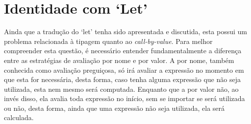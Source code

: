 \section{Identidade com `Let'}
Ainda que a tradução do `let' tenha sido apresentada e discutida, esta possui um problema relacionada à tipagem quanto ao \textit{call-by-value}.
Para melhor compreender esta questão, é necessário entender fundamentalmente a diferença entre as estratégias de avaliação por nome e por valor.
A por nome, também conhecida como avaliação preguiçosa, só irá avaliar a expressão no momento em que esta for necessária, desta forma, caso tenha alguma expressão que não seja utilizada, esta nem mesmo será computada.
Enquanto que a por valor não, ao invés disso, ela avalia toda expressão no início, sem se importar se será utilizada ou não, desta forma, ainda que uma expressão não seja utilizada, ela será calculada.

